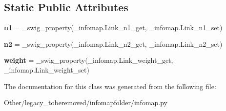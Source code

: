 \subsection*{Static Public Attributes}
\begin{DoxyCompactItemize}
\item 
\mbox{\label{classinfomapfolder_1_1infomap_1_1Link_a689f12be367693a071596bddefa94e10}} 
{\bfseries n1} = \+\_\+swig\+\_\+property(\+\_\+infomap.\+Link\+\_\+n1\+\_\+get, \+\_\+infomap.\+Link\+\_\+n1\+\_\+set)
\item 
\mbox{\label{classinfomapfolder_1_1infomap_1_1Link_aad822bd79a222d4ff4b1f1d0a88c9676}} 
{\bfseries n2} = \+\_\+swig\+\_\+property(\+\_\+infomap.\+Link\+\_\+n2\+\_\+get, \+\_\+infomap.\+Link\+\_\+n2\+\_\+set)
\item 
\mbox{\label{classinfomapfolder_1_1infomap_1_1Link_af3cd2e96ae771efdb2443639418064ef}} 
{\bfseries weight} = \+\_\+swig\+\_\+property(\+\_\+infomap.\+Link\+\_\+weight\+\_\+get, \+\_\+infomap.\+Link\+\_\+weight\+\_\+set)
\end{DoxyCompactItemize}


The documentation for this class was generated from the following file\+:\begin{DoxyCompactItemize}
\item 
Other/legacy\+\_\+toberemoved/infomapfolder/infomap.\+py\end{DoxyCompactItemize}
